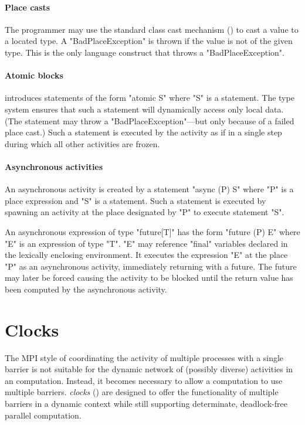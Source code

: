 \paragraph{Place casts}
The programmer may use the standard class cast mechanism
() to cast a value to a located type. A
\xcd"BadPlaceException" is thrown if the value is not of the given
type. This is the only language construct that throws a \xcd"BadPlaceException".

\paragraph{Atomic blocks}

\Xten{} introduces statements of the form \xcd"atomic S" where \xcd"S"
is a statement.  The type system ensures that such a statement will
dynamically access only local data. (The statement may throw
a \xcd"BadPlaceException"---but only because of a failed place cast.)
Such a statement is executed by the activity as if in a single step
during which all other activities are frozen.

\paragraph{Asynchronous activities}

An asynchronous activity is created by a statement \xcd"async (P) S"
where \xcd"P" is a place expression and \xcd"S" is a statement.  Such
a statement is executed by spawning an activity at the place
designated by \xcd"P" to execute statement \xcd"S".

An asynchronous expression of type \xcd"future[T]" has the form
\xcd"future (P) E" where \xcd"E" is an expression of type \xcd"T".  \xcd"E"
may reference \xcd"final" variables declared in the lexically
enclosing environment.  It executes the expression \xcd"E" at the
place \xcd"P" as an asynchronous activity, immediately returning with
a future. The future may later be forced causing the activity to be
blocked until the return value has been computed by the asynchronous
activity.

\section{Clocks}
The MPI style of coordinating the activity of multiple processes with
a single barrier is not suitable for the dynamic network of (possibly
diverse) activities in an \Xten{} computation. Instead, it becomes
necessary to allow a computation to use multiple barriers. \Xten{}
\emph{clocks} () are designed to offer the
functionality of multiple barriers in a dynamic context while still
supporting determinate, deadlock-free parallel computation.

